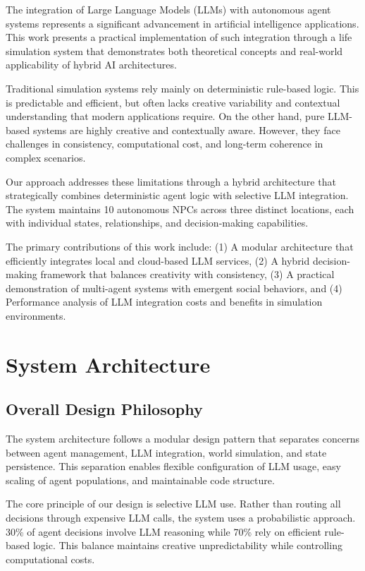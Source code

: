 \documentclass[conference]{IEEEtran}
\begin{document}
The integration of Large Language Models (LLMs) with autonomous agent systems represents a significant advancement in artificial intelligence applications. This work presents a practical implementation of such integration through a life simulation system that demonstrates both theoretical concepts and real-world applicability of hybrid AI architectures.

Traditional simulation systems rely mainly on deterministic rule-based logic. This is predictable and efficient, but often lacks creative variability and contextual understanding that modern applications require. On the other hand, pure LLM-based systems are highly creative and contextually aware. However, they face challenges in consistency, computational cost, and long-term coherence in complex scenarios.

Our approach addresses these limitations through a hybrid architecture that strategically combines deterministic agent logic with selective LLM integration. The system maintains 10 autonomous NPCs across three distinct locations, each with individual states, relationships, and decision-making capabilities.

The primary contributions of this work include: (1) A modular architecture that efficiently integrates local and cloud-based LLM services, (2) A hybrid decision-making framework that balances creativity with consistency, (3) A practical demonstration of multi-agent systems with emergent social behaviors, and (4) Performance analysis of LLM integration costs and benefits in simulation environments.

\section{System Architecture}

\subsection{Overall Design Philosophy}

The system architecture follows a modular design pattern that separates concerns between agent management, LLM integration, world simulation, and state persistence. This separation enables flexible configuration of LLM usage, easy scaling of agent populations, and maintainable code structure.

The core principle of our design is selective LLM use. Rather than routing all decisions through expensive LLM calls, the system uses a probabilistic approach. 30\% of agent decisions involve LLM reasoning while 70\% rely on efficient rule-based logic. This balance maintains creative unpredictability while controlling computational costs.
\end{document}
